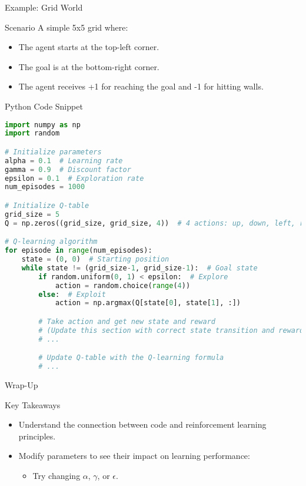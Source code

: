 \documentclass[aspectratio=169]{beamer}
\begin{document}
\begin{frame}[fragile]{Example: Grid World}
    \begin{block}{Scenario}
        A simple 5x5 grid where:
        \begin{itemize}
            \item The agent starts at the top-left corner.
            \item The goal is at the bottom-right corner.
            \item The agent receives +1 for reaching the goal and -1 for hitting walls.
        \end{itemize}
    \end{block}
\end{frame}

\begin{frame}[fragile]{Python Code Snippet}
    \begin{lstlisting}[language=Python]
import numpy as np
import random

# Initialize parameters
alpha = 0.1  # Learning rate
gamma = 0.9  # Discount factor
epsilon = 0.1  # Exploration rate
num_episodes = 1000

# Initialize Q-table
grid_size = 5
Q = np.zeros((grid_size, grid_size, 4))  # 4 actions: up, down, left, right

# Q-learning algorithm
for episode in range(num_episodes):
    state = (0, 0)  # Starting position
    while state != (grid_size-1, grid_size-1):  # Goal state
        if random.uniform(0, 1) < epsilon:  # Explore
            action = random.choice(range(4))
        else:  # Exploit
            action = np.argmax(Q[state[0], state[1], :])

        # Take action and get new state and reward
        # (Update this section with correct state transition and reward)
        # ...

        # Update Q-table with the Q-learning formula
        # ...
    \end{lstlisting}
\end{frame}

\begin{frame}{Wrap-Up}
    \begin{block}{Key Takeaways}
        \begin{itemize}
            \item Understand the connection between code and reinforcement learning principles.
            \item Modify parameters to see their impact on learning performance:
            \begin{itemize}
                \item Try changing $\alpha$, $\gamma$, or $\epsilon$.
            \end{itemize}
        \end{itemize}
    \end{block}
\end{frame}
\end{document}
